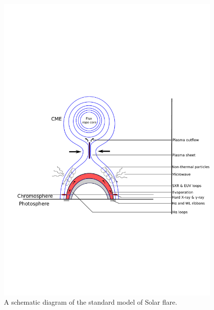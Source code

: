 \begin{figure}[ht!]
    \centering
    \hspace{5cm}
    \includegraphics[trim={1cm 8cm 0cm 8cm}, clip, width=0.95\linewidth]{Figures/std_mod.pdf}
    \caption{A schematic diagram of the standard model of Solar flare.}
    \label{fig:std_mod}
\end{figure}




